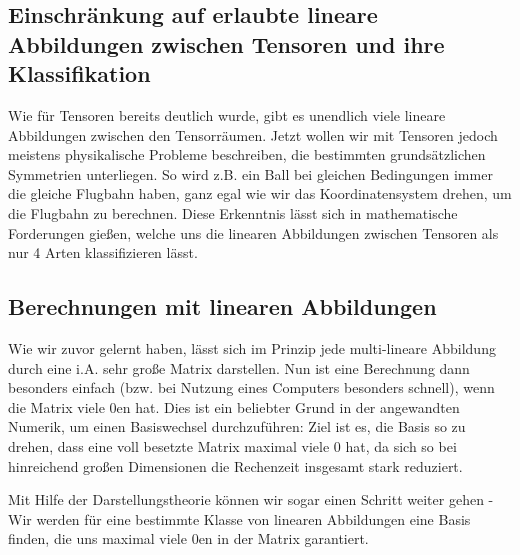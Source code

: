 \subsection{Einschränkung auf erlaubte lineare Abbildungen zwischen Tensoren und ihre Klassifikation}
Wie für Tensoren bereits deutlich wurde, gibt es unendlich viele lineare Abbildungen zwischen den Tensorräumen. Jetzt wollen wir mit Tensoren jedoch meistens physikalische Probleme beschreiben, die bestimmten grundsätzlichen Symmetrien unterliegen. So wird z.B. ein Ball bei gleichen Bedingungen immer die gleiche Flugbahn haben, ganz egal wie wir das Koordinatensystem drehen, um die Flugbahn zu berechnen. Diese Erkenntnis lässt sich in mathematische Forderungen gießen, welche uns die linearen Abbildungen zwischen Tensoren als nur 4 Arten klassifizieren lässt.

\subsection{Berechnungen mit linearen Abbildungen}
Wie wir zuvor gelernt haben, lässt sich im Prinzip jede multi-lineare Abbildung durch eine i.A. sehr große Matrix darstellen. Nun ist eine Berechnung dann besonders einfach (bzw. bei Nutzung eines Computers besonders schnell), wenn die Matrix viele 0en hat. Dies ist ein beliebter Grund in der angewandten Numerik, um einen Basiswechsel durchzuführen: Ziel ist es, die Basis so zu drehen, dass eine voll besetzte Matrix maximal viele 0 hat, da sich so bei hinreichend großen Dimensionen die Rechenzeit insgesamt stark reduziert. 

Mit Hilfe der Darstellungstheorie können wir sogar einen Schritt weiter gehen - Wir werden für eine bestimmte Klasse von linearen Abbildungen eine Basis finden, die uns maximal viele 0en in der Matrix garantiert.

